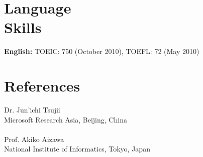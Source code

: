 \documentclass[margin]{res}
\begin{document}
\begin{resume}
\section{Language \\ Skills}
\textbf{English:} TOEIC: 750 (October 2010), TOEFL: 72 (May 2010) \\

\section{References} 
Dr. Jun'ichi Tsujii \\
Microsoft Research Asia, Beijing, China\\
\\
Prof. Akiko Aizawa \\
National Institute of Informatics, Tokyo, Japan\\
\end{resume}
\end{document}

